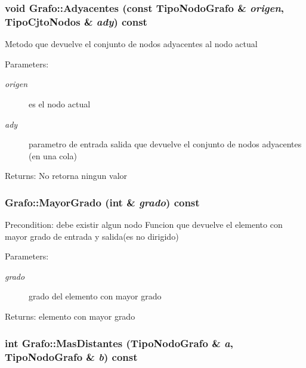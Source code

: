 \subsubsection{\setlength{\rightskip}{0pt plus 5cm}void Grafo::Adyacentes (const {\bf TipoNodoGrafo} \& {\em origen}, {\bf TipoCjtoNodos} \& {\em ady}) const}\label{classGrafo_25a7ac274277ddc0861a03785f29ec87}


Metodo que devuelve el conjunto de nodos adyacentes al nodo actual \begin{Desc}
\item[Parameters:]
\begin{description}
\item[{\em origen}]es el nodo actual \item[{\em ady}]parametro de entrada salida que devuelve el conjunto de nodos adyacentes (en una cola) \end{description}
\end{Desc}
\begin{Desc}
\item[Returns:]No retorna ningun valor \end{Desc}
\subsubsection{ Grafo::MayorGrado (int \& {\em grado}) const}\label{classGrafo_901231e4cb7c93017e36b7491e2db26c}


\begin{Desc}
\item[Precondition:]debe existir algun nodo Funcion que devuelve el elemento con mayor grado de entrada y salida(es no dirigido) \end{Desc}
\begin{Desc}
\item[Parameters:]
\begin{description}
\item[{\em grado}]grado del elemento con mayor grado \end{description}
\end{Desc}
\begin{Desc}
\item[Returns:]elemento con mayor grado \end{Desc}
\subsubsection{\setlength{\rightskip}{0pt plus 5cm}int Grafo::MasDistantes ({\bf TipoNodoGrafo} \& {\em a}, {\bf TipoNodoGrafo} \& {\em b}) const}\label{classGrafo_a33a7c07992fbf47a0125701f6fd729a}


